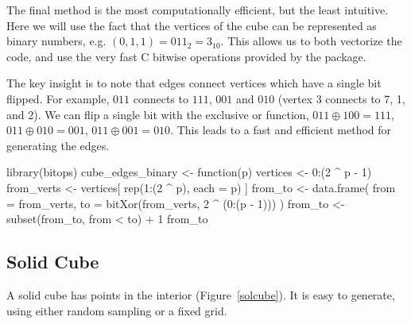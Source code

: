\begin{itemize}
    The final method is the most computationally efficient, but the
    least intuitive. Here we will use the fact that the vertices of
    the cube can be represented as binary numbers, e.g.  $(0, 1, 1) =
    011_2 = 3_{10}$. This allows us to both vectorize the code, and
    use the very fast C bitwise operations provided by the
     package.

    The key insight is to note that edges connect vertices which have
    a single bit flipped. For example, $011$ connects to $111$, $001$
    and $010$ (vertex 3 connects to 7, 1, and 2). We can flip a single
    bit with the exclusive or function, $011 \oplus 100 = 111$, $011
    \oplus 010 = 001$, $011 \oplus 001 = 010$.  This leads to a fast
    and efficient method for generating the edges.

\newpage
\begin{example}
library(bitops)
cube_edges_binary <- function(p) {
  vertices <- 0:(2 ^ p - 1)
  from_verts <- vertices[
    rep(1:(2 ^ p), each = p)
  ]
  from_to <- data.frame(
    from = from_verts,
    to = bitXor(from_verts, 2 ^ (0:(p - 1)))
  )
  from_to <- subset(from_to, from < to) + 1
  from_to
}
\end{example}

\end{itemize}


\subsection{Solid Cube}

A solid cube has points in the interior (Figure~\ref{solcube}). It is
easy to generate, using either random sampling or a fixed grid.

